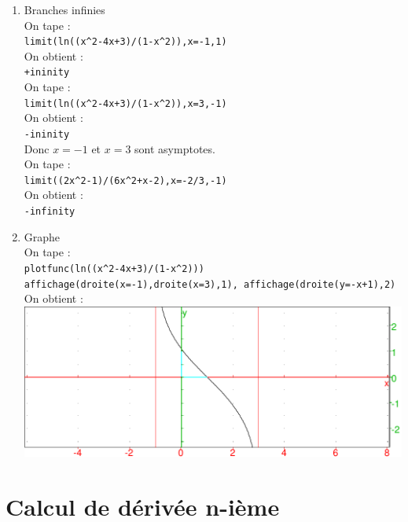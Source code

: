 \documentclass[a4paper,11pt]{book}
\begin{document}
\begin{enumerate}
\item Branches infinies\\
On tape :\\
{\tt limit(ln((x\verb|^|2-4x+3)/(1-x\verb|^|2)),x=-1,1)}\\
On obtient :\\
{\tt +ininity}\\
On tape :\\
{\tt limit(ln((x\verb|^|2-4x+3)/(1-x\verb|^|2)),x=3,-1)}\\
On obtient :\\
{\tt -ininity}\\
Donc $x=-1$ et $x=3$ sont asymptotes.\\
On tape :\\
{\tt limit((2x\verb|^|2-1)/(6x\verb|^|2+x-2),x=-2/3,-1)}\\
On obtient :\\
{\tt -infinity}\\
\item Graphe\\
On tape :\\
{\tt plotfunc(ln((x\verb|^|2-4x+3)/(1-x\verb|^|2)))}\\
{\tt affichage(droite(x=-1),droite(x=3),1),
affichage(droite(y=-x+1),2)}\\
On obtient :\\
\includegraphics[width=\textwidth]{graphexo1}
\end{enumerate}
\section{Calcul de d\'eriv\'ee n-i\`eme}
\end{document}

